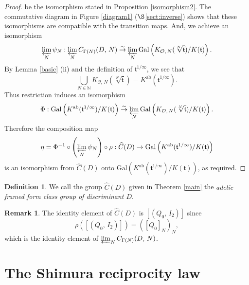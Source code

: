 \documentclass[reqno,11pt]{article}
\theoremstyle{plain} %
\theoremstyle{definition} %
\newtheorem{definition}[theorem]{\indent\sc Definition}
\newtheorem{remark}[theorem]{\indent\sc Remark}
\begin{document}
\begin{proof}
be the isomorphism stated in Proposition \ref{isomorphism2}. 
The commutative diagram in Figure \ref{diagram1} ($\S$\ref{sect:inverse}) shows that these
isomorphisms are compatible with the transition maps. And, we achieve an 
isomorphism
\begin{equation*}
\varprojlim_N\psi_N:
\varprojlim_N C_{\Gamma(N)}(D,\,N)
\stackrel{\sim}{\rightarrow}
\varprojlim_N
\mathrm{Gal}\left(K_{\mathcal{O},\,N}(\sqrt[N]{\mathfrak{t}})/K(\mathfrak{t})\right).
\end{equation*}
By Lemma \ref{basic} (ii) and the definition of $\mathfrak{t}^{1/\infty}$, we see that
\begin{equation*}
\bigcup_{N\in\mathbb{N}}
K_{\mathcal{O},\,N}(\sqrt[N]{\mathfrak{t}})
=K^{\mathrm{ab}}(\mathfrak{t}^{1/\infty}).
\end{equation*}
Thus restriction induces an isomorphism
\begin{equation*}
\Phi:\mathrm{Gal}\left(K^{\mathrm{ab}}(\mathfrak{t}^{1/\infty})/K(\mathfrak{t})\right)
\stackrel{\sim}{\rightarrow}
\varprojlim_N
\mathrm{Gal}\left(K_{\mathcal{O},\,N}(\sqrt[N]{\mathfrak{t}})/K(\mathfrak{t})\right).
\end{equation*}
Therefore the composition map
\begin{equation}\label{constructeta}
\eta=\Phi^{-1}\circ\left(\varprojlim_N\psi_N\right)\circ\rho:\widehat{C}(D)
\rightarrow\mathrm{Gal}\left(K^{\mathrm{ab}}(\mathfrak{t}^{1/\infty})/K(\mathfrak{t})\right)
\end{equation}
is an isomorphism from $\widehat{C}(D)$ onto
$\mathrm{Gal}\left(K^\mathrm{ab}(\mathfrak{t}^{1/\infty})/K(\mathfrak{t})\right)$,
as required.
\end{proof}

\begin{definition}
We call the group $\widehat{C}(D)$ given in Theorem \ref{main}
the \textit{adelic framed form class group of discriminant $D$}. 
\end{definition}

\begin{remark}
The identity element of $\widehat{C}(D)$ is $[(Q_0,\,I_2)]$ since
\begin{equation*}
\rho([(Q_0,\,I_2)])=([Q_0]_N)_N,
\end{equation*} 
which is the identity element of $\varprojlim_N C_{\Gamma(N)}(D,\,N)$. 
\end{remark}

\section {The Shimura reciprocity law}\label{sect:Shimura}
\end{document}
